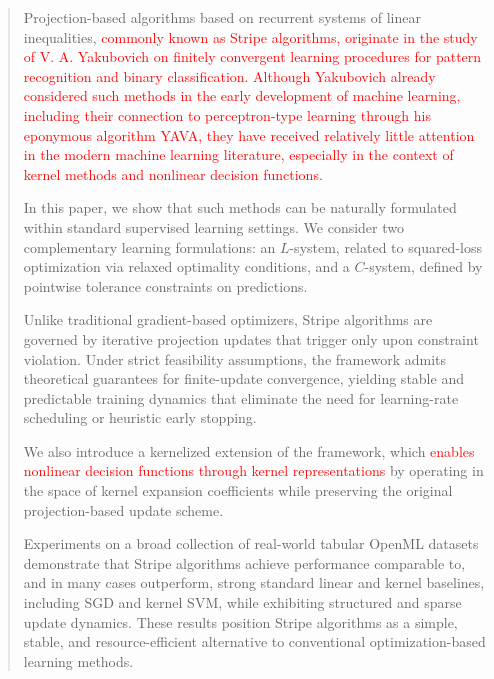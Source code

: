 \documentclass[a4paper,fleqn]{cas-sc}
\begin{document}
\begin{abstract}
Projection-based algorithms based on recurrent systems of linear inequalities, \textcolor{red}{commonly known as Stripe algorithms, originate in the study of V. A. Yakubovich on finitely convergent learning procedures for pattern recognition and binary classification. Although Yakubovich already considered such methods in the early development of machine learning, including their connection to perceptron-type learning through his eponymous algorithm YAVA, they have received relatively little attention in the modern machine learning literature, especially in the context of kernel methods and nonlinear decision functions.}


In this paper, we show that such methods can be naturally formulated within standard supervised learning settings. We consider two complementary learning formulations: an $L$-system, related to squared-loss optimization via relaxed optimality conditions, and a $C$-system, defined by pointwise tolerance constraints on predictions.

Unlike traditional gradient-based optimizers, Stripe algorithms are governed by iterative projection updates that trigger only upon constraint violation. Under strict feasibility assumptions, the framework admits theoretical guarantees for finite-update convergence, yielding stable and predictable training dynamics that eliminate the need for learning-rate scheduling or heuristic early stopping.



We also introduce a kernelized extension of the framework, which \textcolor{red}{enables nonlinear decision functions through kernel representations} by operating in the space of kernel expansion coefficients while preserving the original projection-based update scheme.

Experiments on a broad collection of real-world tabular OpenML datasets demonstrate that Stripe algorithms achieve performance comparable to, and in many cases outperform, strong standard linear and kernel baselines, including SGD and kernel SVM, while exhibiting structured and sparse update dynamics. These results position Stripe algorithms as a simple, stable, and resource-efficient alternative to conventional optimization-based learning methods.

\end{abstract}
\end{document}
